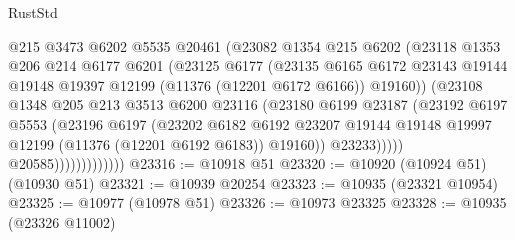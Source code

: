 \begin{lexlean}{RustStd}
\begin{coremodule}
{{{{{{{{{{{{{{{{{{{                              @215
                              @3473
                              @6202
                              @5535
                              @20461
                              (@23082
                                @1354
                                @215
                                @6202
                                (@23118
                                  @1353
                                  @206
                                  @214
                                  @6177
                                  @6201
                                  (@23125
                                    @6177
                                    (@23135
                                      @6165
                                      @6172
                                      @23143
                                      @19144
                                      @19148
                                      @19397
                                      @12199
                                      (@11376 (@12201 @6172 @6166))
                                      @19160))
                                  (@23108
                                    @1348
                                    @205
                                    @213
                                    @3513
                                    @6200
                                    @23116
                                    (@23180
                                      @6199
                                      @23187
                                      (@23192
                                        @6197
                                        @5553
                                        (@23196
                                          @6197
                                          (@23202
                                            @6182
                                            @6192
                                            @23207
                                            @19144
                                            @19148
                                            @19997
                                            @12199
                                            (@11376 (@12201 @6192 @6183))
                                            @19160))
                                        @23233)))))
                              @20585)))))))))))))
@23316 := @10918 @51
@23320 := @10920 (@10924 @51) (@10930 @51)
@23321 := @10939 @20254
@23323 := @10935 (@23321 @10954)
@23325 := @10977 (@10978 @51)
@23326 := @10973 @23325
@23328 := @10935 (@23326 @11002)
}}}}}}}}}}}}}}}}}}}
\end{coremodule}
\end{lexlean}
